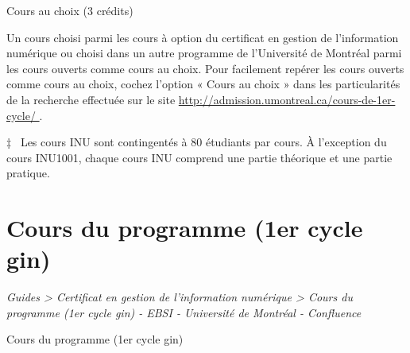 \documentclass [12 pt]{article}
\begin{document}
                        
                            
                                Cours au choix (3 crédits)
                            
                        
                        
                            Un cours choisi parmi les cours à
                                option du certificat en gestion de l'information numérique ou choisi
                                dans un autre programme de l'Université de Montréal parmi les cours
                                ouverts comme cours au choix. Pour facilement repérer les cours
                                ouverts comme cours au choix, cochez l'option « Cours au choix »
                                dans les particularités de la recherche effectuée sur le site 
        \href{
        http://admission.umontreal.ca/cours-de-1er-cycle/
        } {
        http://admission.umontreal.ca/cours-de-1er-cycle/
        }
    . 
                        
                    
                
            
            ‡  Les cours INU sont contingentés à 80 étudiants par cours. À l'exception du
                cours INU1001, chaque cours INU comprend une partie théorique et une partie
                pratique.
        
    
    
        \newpage
        \section {
        Cours du programme (1er cycle gin)
        }
        
        
        
        \textit{
        Guides > Certificat en gestion de l'information numérique > Cours du
            programme (1er cycle gin) - EBSI - Université de Montréal - Confluence
        }
    
        Cours du programme (1er cycle gin)
        
\end{document}
